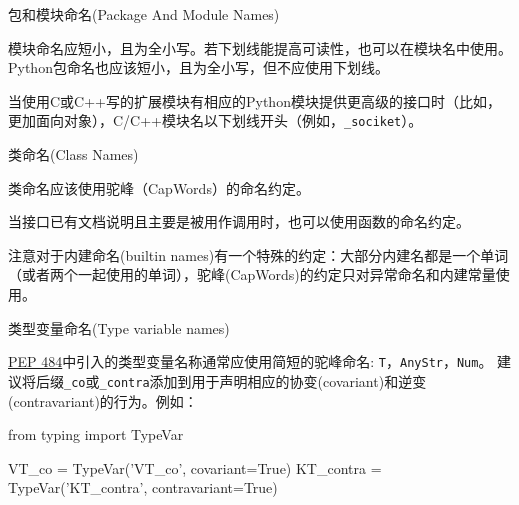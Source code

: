 \documentclass[ignorenonframetext,9pt]{beamer}
\newenvironment{Shaded}{}{}
\newcommand{\ImportTok}[1]{#1}
\newcommand{\NormalTok}[1]{#1}
\newcommand{\OperatorTok}[1]{\textcolor[rgb]{0.40,0.40,0.40}{#1}}
\newcommand{\StringTok}[1]{\textcolor[rgb]{0.25,0.44,0.63}{#1}}
\newcommand{\VariableTok}[1]{\textcolor[rgb]{0.10,0.09,0.49}{#1}}
\begin{document}
\begin{frame}[fragile]
\begin{block}

\begin{block}{包和模块命名(Package And Module Names)}

模块命名应短小，且为全小写。若下划线能提高可读性，也可以在模块名中使用。Python包命名也应该短小，且为全小写，但不应使用下划线。

当使用C或C++写的扩展模块有相应的Python模块提供更高级的接口时（比如，更加面向对象），C/C++模块名以下划线开头（例如，\texttt{\_sociket}）。

\end{block}
\begin{block}{类命名(Class Names)}

类命名应该使用驼峰（CapWords）的命名约定。

当接口已有文档说明且主要是被用作调用时，也可以使用函数的命名约定。

注意对于内建命名(builtin
names)有一个特殊的约定：大部分内建名都是一个单词（或者两个一起使用的单词），驼峰(CapWords)的约定只对异常命名和内建常量使用。

\end{block}
\end{block}

\end{frame}

\begin{frame}[fragile]



\begin{block}{类型变量命名(Type variable names)}

\href{https://www.python.org/dev/peps/pep-0484}{PEP
484}中引入的类型变量名称通常应使用简短的驼峰命名:
\texttt{T}，\texttt{AnyStr}，\texttt{Num}。
建议将后缀\texttt{\_co}或\texttt{\_contra}添加到用于声明相应的协变(covariant)和逆变(contravariant)的行为。例如：

\begin{Shaded}
\begin{Highlighting}[]
\ImportTok{from}\NormalTok{ typing }\ImportTok{import}\NormalTok{ TypeVar}

\NormalTok{VT_co }\OperatorTok{=}\NormalTok{ TypeVar(}\StringTok{'VT_co'}\NormalTok{, covariant}\OperatorTok{=}\VariableTok{True}\NormalTok{)}
\NormalTok{KT_contra }\OperatorTok{=}\NormalTok{ TypeVar(}\StringTok{'KT_contra'}\NormalTok{, contravariant}\OperatorTok{=}\VariableTok{True}\NormalTok{)}
\end{Highlighting}
\end{Shaded}

\end{block}

\end{frame}
\end{document}
